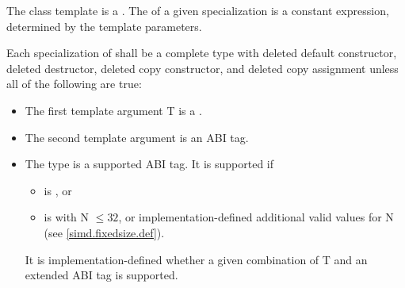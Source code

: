 

\pnum The class template \simd{} is a \dataparalleltype.
The \width of a given \simd specialization is a constant expression, determined by the template parameters.

\newcommand\simdTypeRequirements[1]{
\pnum\label{#1.type requirements}\label{#1.deleted}%
Each specialization of \type{#1} shall be a complete type with deleted default constructor, deleted destructor, deleted copy constructor, and deleted copy assignment unless all of the following are true:
\begin{itemize}
  \item The first template argument \type T is a \realArithmeticType.
  \item The second template argument \type{Abi} is an ABI tag.
  \item The \type{Abi} type is a supported ABI tag.
    It is supported if
    \begin{itemize}
      \item \type{Abi} is \type{simd_abi::scalar}, or
      \item \type{Abi} is \fixedsizeN with \code N $\le 32$, or implementation-defined additional valid values for \code N (see \ref{simd.fixedsize.def}).
    \end{itemize}
    It is implementation-defined whether a given combination of \type T and an extended ABI tag is supported.
\end{itemize}
}
\simdTypeRequirements{simd}


